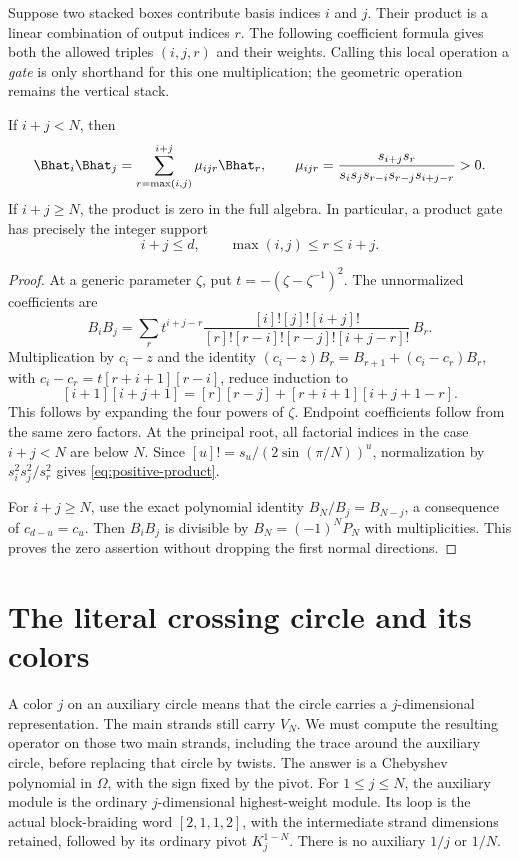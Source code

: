Suppose two stacked boxes contribute basis indices $i$ and $j$. Their product is a linear combination of output indices $r$. The following coefficient formula gives both the allowed triples $(i,j,r)$ and their weights. Calling this local operation a \emph{gate} is only shorthand for this one multiplication; the geometric operation remains the vertical stack.
\begin{theorem}\label{thm:positive-product}
If $i+j<N$, then
\begin{equation}\label{eq:positive-product}
 \Bhat_i\Bhat_j=\sum_{r=\max(i,j)}^{i+j}\mu_{ijr}\Bhat_r,
 \qquad
 \mu_{ijr}=\frac{s_{i+j}s_r}
 {s_i s_j s_{r-i}s_{r-j}s_{i+j-r}}>0.
\end{equation}
If $i+j\ge N$, the product is zero in the full algebra. In particular, a product gate has precisely the integer support
\begin{equation}\label{eq:gate-support}
 i+j\le d,\qquad \max(i,j)\le r\le i+j.
\end{equation}
\end{theorem}
\begin{proof}
At a generic parameter $\zeta$, put $t=-(\zeta-\zeta^{-1})^2$. The unnormalized coefficients are
\[
 B_iB_j=\sum_r
 t^{i+j-r}\frac{[i]![j]![i+j]!}
 {[r]![r-i]![r-j]![i+j-r]!}\,B_r.
\]
Multiplication by $c_i-z$ and the identity
$(c_i-z)B_r=B_{r+1}+(c_i-c_r)B_r$, with
$c_i-c_r=t[r+i+1][r-i]$, reduce induction to
\[
 [i+1][i+j+1]=[r][r-j]+[r+i+1][i+j+1-r].
\]
This follows by expanding the four powers of $\zeta$. Endpoint coefficients follow from the same zero factors. At the principal root, all factorial indices in the case $i+j<N$ are below $N$. Since $[u]!=s_u/(2\sin(\pi/N))^u$, normalization by $s_i^2s_j^2/s_r^2$ gives \eqref{eq:positive-product}.

For $i+j\ge N$, use the exact polynomial identity $B_N/B_j=B_{N-j}$, a consequence of $c_{d-u}=c_u$. Then $B_iB_j$ is divisible by $B_N=(-1)^NP_N$ with multiplicities. This proves the zero assertion without dropping the first normal directions.
\end{proof}

\section{The literal crossing circle and its colors}

A color $j$ on an auxiliary circle means that the circle carries a $j$-dimensional representation. The main strands still carry $V_N$. We must compute the resulting operator on those two main strands, including the trace around the auxiliary circle, before replacing that circle by twists. The answer is a Chebyshev polynomial in $\Omega$, with the sign fixed by the pivot.
For $1\le j\le N$, the auxiliary module is the ordinary $j$-dimensional highest-weight module. Its loop is the actual block-braiding word $[2,1,1,2]$, with the intermediate strand dimensions retained, followed by its ordinary pivot $K_j^{1-N}$. There is no auxiliary $1/j$ or $1/N$.

